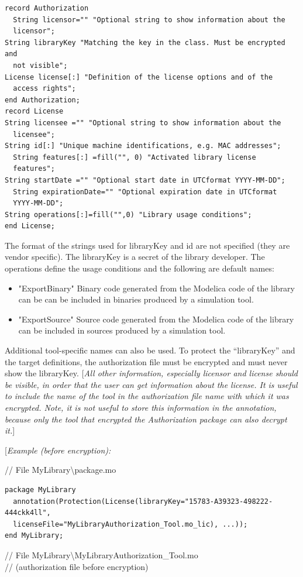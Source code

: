 \documentclass[10pt,a4paper]{report}
\begin{document}
\begin{lstlisting}[language=modelica]
record Authorization
  String licensor="" "Optional string to show information about the
  licensor";
String libraryKey "Matching the key in the class. Must be encrypted and
  not visible";
License license[:] "Definition of the license options and of the
  access rights";
end Authorization;
record License
String licensee ="" "Optional string to show information about the
  licensee";
String id[:] "Unique machine identifications, e.g. MAC addresses";
  String features[:] =fill("", 0) "Activated library license
  features";
String startDate ="" "Optional start date in UTCformat YYYY-MM-DD";
  String expirationDate="" "Optional expiration date in UTCformat
  YYYY-MM-DD";
String operations[:]=fill("",0) "Library usage conditions";
end License;
\end{lstlisting}
The format of the strings used for libraryKey and id are not specified
(they are vendor specific). The libraryKey is a secret of the library
developer. The operations define the usage conditions and the following
are default names:

\begin{itemize}
\item
  "ExportBinary" Binary code generated from the Modelica code of the
  library can be can be included in binaries produced by a simulation
  tool.
\item
  "ExportSource" Source code generated from the Modelica code of the
  library can be included in sources produced by a simulation tool.
\end{itemize}

Additional tool-specific names can also be used. To protect the
``libraryKey'' and the target definitions, the authorization file must
be encrypted and must never show the libraryKey. {[}\emph{All other
information, especially licensor and license should be visible, in order
that the user can get information about the license. It is useful to
include the name of the tool in the authorization file name with which
it was encrypted. Note, it is not useful to store this information in
the annotation, because only the tool that encrypted the Authorization
package can also decrypt it.}{]}

{[}\emph{Example (before encryption):}

// File MyLibrary\textbackslash{}package.mo

\begin{lstlisting}[language=modelica]
package MyLibrary
  annotation(Protection(License(libraryKey="15783-A39323-498222-444ckk4ll",
  licenseFile="MyLibraryAuthorization_Tool.mo_lic), ...));
end MyLibrary;
\end{lstlisting}
// File MyLibrary\textbackslash{}MyLibraryAuthorization\_Tool.mo\\
// (authorization file before encryption)
\end{document}
